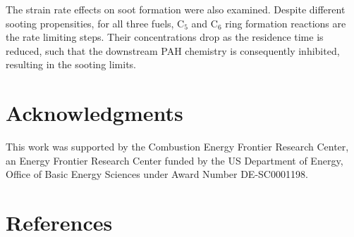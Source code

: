 \documentclass[review,3p,times]{elsarticleUS}
\begin{document}
The strain rate effects on soot formation were also examined. Despite different sooting propensities, for all three fuels, C$_5$ and C$_6$ ring formation reactions are the rate limiting steps. Their concentrations drop as the residence time is reduced, such that the downstream PAH chemistry is consequently inhibited, resulting in the sooting limits.


\section*{Acknowledgments}
This work was supported by the Combustion Energy Frontier Research Center, an Energy Frontier Research Center funded by the US Department of Energy, Office of Basic Energy Sciences under Award Number DE-SC0001198.

\section*{References}




\renewcommand{\thefigure}{\arabic{figure}}
\renewcommand{\thetable}{\arabic{table}}
\end{document}
